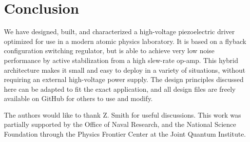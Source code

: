 \documentclass[aip,rsi,reprint]{revtex4-1} %
\begin{document}
\section{Conclusion}
\label{Sec:Conclusion}

We have designed, built, and characterized a high-voltage piezoelectric driver optimized for use in a modern atomic physics laboratory.
It is based on a flyback configuration switching regulator, but is able to achieve very low noise performance by active stabilization from a high slew-rate op-amp.
This hybrid architecture makes it small and easy to deploy in a variety of situations, without requiring an external high-voltage power supply.
The design principles discussed here can be adapted to fit the exact application, and all design files are freely available on GitHub for others to use and modify.

\begin{acknowledgments}
The authors would like to thank Z. Smith for useful discussions.
This work was partially supported by the Office of Naval Research, and the National Science Foundation through the Physics Frontier Center at the Joint Quantum Institute.
\end{acknowledgments}


\end{document}
